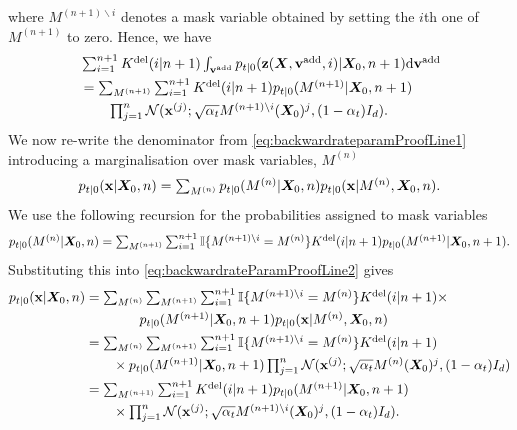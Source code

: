 where $M^{(n+1) \backslash i}$ denotes a mask variable obtained by setting the $i$th one of $M^{(n+1)}$ to zero.
Hence, we have 
\begin{align}
    &\textstyle \sum_{i=1}^{n+1} K^{\text{del}}(i | n+1) \int_{{\mathbf{v}}^{\textup{add}}} p_{t|0}(\mathbf{z}({\bm{X}}, {\mathbf{v}}^{\textup{add}}, i) | {\bm{X}}_0, n+1) \mathrm{d} {\mathbf{v}}^{\textup{add}} \\
    &\textstyle  = \sum_{M^{(n+1)}} \sum_{i=1}^{n+1} K^{\text{del}}(i | n+1)  p_{t|0}(M^{(n+1)} | {\bm{X}}_0, n+1) \\
  & \qquad \textstyle \prod_{j=1}^{n}\mathcal{N}( {\mathbf{x}}^{(j)} ; \sqrt{\alpha_t} M^{(n+1) \backslash i}({\bm{X}}_0)^j, (1-\alpha_t) I_d) .
    \label{eq:backwardrateParamProofLine1p5}
\end{align}
We now re-write the denominator from \eqref{eq:backwardrateparamProofLine1} introducing a marginalisation over mask variables, $M^{(n)}$
\begin{equation}
    \textstyle p_{t|0}({\mathbf{x}} | {\bm{X}}_0, n) = \sum_{M^{(n)}} p_{t|0}(M^{(n)} | {\bm{X}}_0, n) p_{t|0}({\mathbf{x}} | M^{(n)}, {\bm{X}}_0, n)  . 
    \label{eq:backwardrateParamProofLine2}
\end{equation}
We use the following recursion for the probabilities assigned to mask variables
\begin{equation}
\textstyle    p_{t|0}(M^{(n)} | {\bm{X}}_0, n) = \sum_{M^{(n+1)}}  \sum_{i=1}^{n+1} \mathbb{I}\{ M^{(n+1) \backslash i} = M^{(n)} \} K^{\text{del}}(i | n+1) p_{t|0}(M^{(n+1)} | {\bm{X}}_0, n+1) . 
\end{equation}
 Substituting this into \eqref{eq:backwardrateParamProofLine2} gives
\begin{align}
    p_{t|0}({\mathbf{x}} | {\bm{X}}_0, n) &\textstyle = \sum_{M^{(n)}}  \sum_{M^{(n+1)}} \sum_{i=1}^{n+1} \mathbb{I}\{ M^{(n+1) \backslash i} = M^{(n)} \} K^{\text{del}}(i | n+1)  \times\\
    &\textstyle  \qquad \qquad p_{t|0}(M^{(n+1)} | {\bm{X}}_0, n+1) p_{t|0}({\mathbf{x}} | M^{(n)}, {\bm{X}}_0, n)\\
    &\textstyle = \sum_{M^{(n)}}  \sum_{M^{(n+1)}} \sum_{i=1}^{n+1} \mathbb{I}\{ M^{(n+1) \backslash i} = M^{(n)} \} K^{\text{del}}(i | n+1) \\ 
    &\textstyle  \qquad  \times  p_{t|0}(M^{(n+1)} | {\bm{X}}_0, n+1) \prod_{j=1}^n \mathcal{N}({\mathbf{x}}^{(j)} ; \sqrt{\alpha_t} M^{(n)} ({\bm{X}}_0)^j, (1-\alpha_t) I_d)\\
                          &\textstyle = \sum_{M^{(n+1)}} \sum_{i=1}^{n+1} K^{\text{del}}(i | n+1) p_{t|0}(M^{(n+1)} | {\bm{X}}_0, n+1)\\
  & \qquad \textstyle \times \prod_{j=1}^n \mathcal{N}({\mathbf{x}}^{(j)} ; \sqrt{\alpha_t} M^{(n+1) \backslash i} ({\bm{X}}_0)^j, (1-\alpha_t) I_d) .
\end{align}
